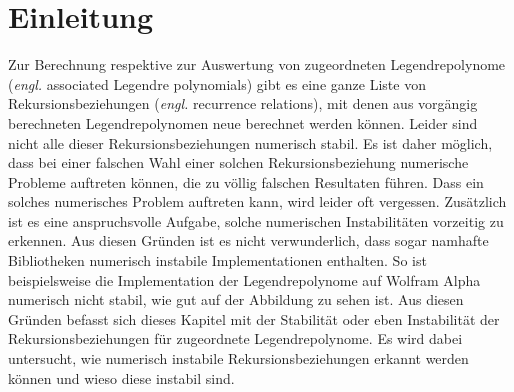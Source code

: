 %
%
%
\section{Einleitung\label{legendre:section:einleitung}}
Zur Berechnung respektive zur Auswertung von zugeordneten Legendrepolynome (\textit{engl.} associated Legendre polynomials) gibt es eine ganze Liste von Rekursionsbeziehungen (\textit{engl.} recurrence relations), mit denen aus vorgängig berechneten Legendrepolynomen neue berechnet werden können.
Leider sind nicht alle dieser Rekursionsbeziehungen numerisch stabil.
Es ist daher möglich, dass bei einer falschen Wahl einer solchen Rekursionsbeziehung numerische Probleme auftreten können, die zu völlig falschen Resultaten führen.
Dass ein solches numerisches Problem auftreten kann, wird leider oft vergessen.
Zusätzlich ist es eine anspruchsvolle Aufgabe, solche numerischen Instabilitäten vorzeitig zu erkennen.
Aus diesen Gründen ist es nicht verwunderlich, dass sogar namhafte Bibliotheken numerisch instabile Implementationen enthalten.
So ist beispielsweise die Implementation der Legendrepolynome auf Wolfram Alpha \cite{legendre:wolfram-alpha} numerisch nicht stabil, wie gut auf der Abbildung  zu sehen ist.
Aus diesen Gründen befasst sich dieses Kapitel mit der Stabilität oder eben Instabilität der Rekursionsbeziehungen für zugeordnete Legendrepolynome.
Es wird dabei untersucht, wie numerisch instabile Rekursionsbeziehungen erkannt werden können und wieso diese instabil sind.







